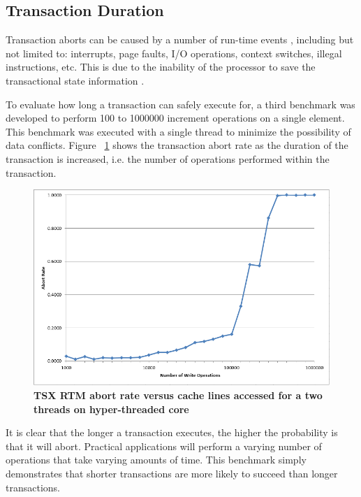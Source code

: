 \documentclass[a4paper]{article}
\begin{document}
\subsection{\textbf{Transaction Duration}}

\indent 
Transaction aborts can be caused by a number of run-time events
\cite{intel_prog_ref}, including but not limited to: interrupts, page faults,
I/O operations, context switches, illegal instructions, etc.  This is due to the
inability of the processor to save the transactional state information
\cite{schwahn}.
\par

\indent
To evaluate how long a transaction can safely execute for, a third
benchmark was developed to perform 100 to 1000000 increment operations on a
single element.  This benchmark was executed with a single thread to minimize
the possibility of data conflicts. Figure ~\ref{fig:trx_duration} shows the
transaction abort rate as the duration of the transaction is increased, i.e. the
number of operations performed within the transaction.
\par

\begin{figure}[H]
    \centering
    \graphicspath{ {./figures/} }
    \includegraphics[width=\textwidth,height=\textheight,keepaspectratio]{trx_duration}
    \caption{\textbf{TSX RTM abort rate versus cache lines accessed for a two 
    threads on hyper-threaded core}}
    \label{fig:trx_duration}
\end{figure}

\indent 
It is clear that the longer a transaction executes, the higher the probability
is that it will abort.  Practical applications will perform a varying number of
operations that take varying amounts of time.  This benchmark simply
demonstrates that shorter transactions are more likely to succeed than longer
transactions.
\par
\end{document}
